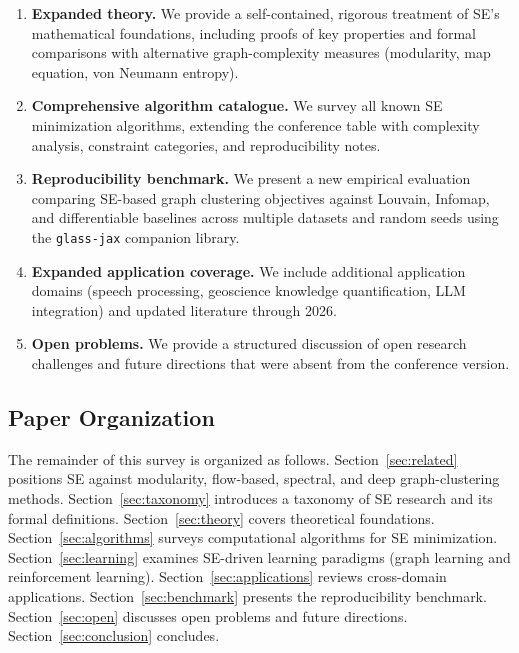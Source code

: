 \begin{enumerate}
  \item \textbf{Expanded theory.}
        We provide a self-contained, rigorous treatment of SE's mathematical
        foundations, including proofs of key properties and formal comparisons
        with alternative graph-complexity measures (modularity, map equation,
        von Neumann entropy).

  \item \textbf{Comprehensive algorithm catalogue.}
        We survey all known SE minimization algorithms, extending the
        conference table with complexity analysis, constraint categories, and
        reproducibility notes.

  \item \textbf{Reproducibility benchmark.}
        We present a new empirical evaluation comparing SE-based graph
        clustering objectives against Louvain, Infomap, and differentiable
        baselines across multiple datasets and random seeds using the
        \texttt{glass-jax} companion library.

  \item \textbf{Expanded application coverage.}
        We include additional application domains (speech processing,
        geoscience knowledge quantification, LLM integration) and updated
        literature through 2026.

  \item \textbf{Open problems.}
        We provide a structured discussion of open research challenges and
        future directions that were absent from the conference version.
\end{enumerate}

\subsection*{Paper Organization}

The remainder of this survey is organized as follows.
Section~\ref{sec:related} positions SE against modularity, flow-based,
spectral, and deep graph-clustering methods.
Section~\ref{sec:taxonomy} introduces a taxonomy of SE research and its
formal definitions.
Section~\ref{sec:theory} covers theoretical foundations.
Section~\ref{sec:algorithms} surveys computational algorithms for SE
minimization.
Section~\ref{sec:learning} examines SE-driven learning paradigms (graph
learning and reinforcement learning).
Section~\ref{sec:applications} reviews cross-domain applications.
Section~\ref{sec:benchmark} presents the reproducibility benchmark.
Section~\ref{sec:open} discusses open problems and future directions.
Section~\ref{sec:conclusion} concludes.
